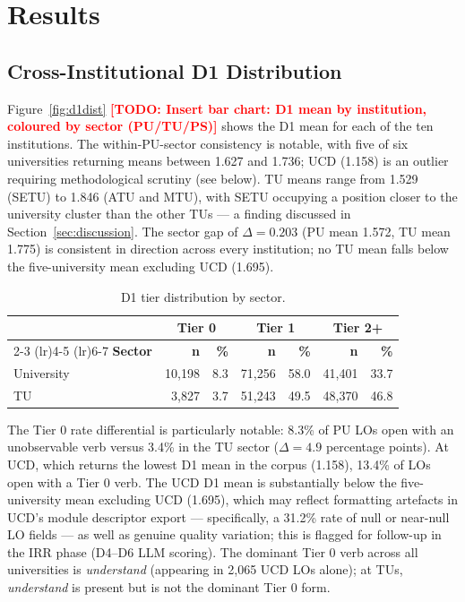 \documentclass[12pt, a4paper]{article}
\newcommand{\todo}[1]{\textcolor{red}{\textbf{[TODO: #1]}}}
\begin{document}
\section{Results}
\label{sec:results}

\subsection{Cross-Institutional D1 Distribution}

Figure~\ref{fig:d1dist} \todo{Insert bar chart: D1 mean by institution, coloured by
sector (PU/TU/PS)} shows the D1 mean for each of the ten institutions. The
within-PU-sector consistency is notable, with five of six universities returning means
between 1.627 and 1.736; UCD (1.158) is an outlier requiring methodological scrutiny
(see below). TU means range from 1.529 (SETU) to 1.846 (ATU and MTU), with SETU
occupying a position closer to the university cluster than the other TUs --- a finding
discussed in Section~\ref{sec:discussion}. The sector gap of $\Delta = 0.203$ (PU mean
1.572, TU mean 1.775) is consistent in direction across every institution; no TU mean
falls below the five-university mean excluding UCD (1.695).

\begin{table}[H]
\centering
\caption{D1 tier distribution by sector.}
\label{tab:tiers}
\begin{tabular}{lrrrrrr}
\toprule
& \multicolumn{2}{c}{\textbf{Tier 0}} & \multicolumn{2}{c}{\textbf{Tier 1}} & \multicolumn{2}{c}{\textbf{Tier 2+}} \\
\cmidrule(lr){2-3} \cmidrule(lr){4-5} \cmidrule(lr){6-7}
\textbf{Sector} & \textbf{n} & \textbf{\%} & \textbf{n} & \textbf{\%} & \textbf{n} & \textbf{\%} \\
\midrule
University  & 10,198 &  8.3 & 71,256 & 58.0 & 41,401 & 33.7 \\
TU          &  3,827 &  3.7 & 51,243 & 49.5 & 48,370 & 46.8 \\
\bottomrule
\end{tabular}
\end{table}

The Tier 0 rate differential is particularly notable: 8.3\% of PU LOs
open with an unobservable verb versus 3.4\% in the TU sector ($\Delta = 4.9$
percentage points). At UCD, which returns the lowest D1 mean in the corpus (1.158),
13.4\% of LOs open with a Tier 0 verb. The UCD D1 mean is substantially below
the five-university mean excluding UCD (1.695), which may reflect formatting
artefacts in UCD's module descriptor export --- specifically, a 31.2\% rate of
null or near-null LO fields --- as well as genuine quality variation; this is
flagged for follow-up in the IRR phase (D4--D6 LLM scoring). The dominant
Tier 0 verb across all universities is \textit{understand} (appearing in 2,065
UCD LOs alone); at TUs, \textit{understand} is present but is not the dominant
Tier 0 form.
\end{document}
